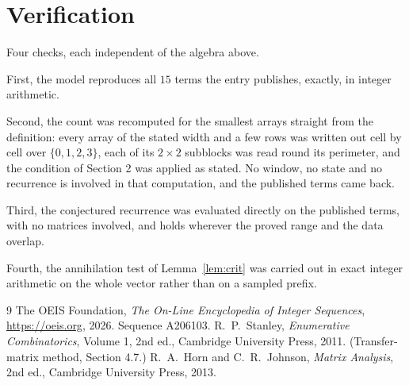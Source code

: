 \documentclass[11pt,a4paper]{article}
\theoremstyle{plain}
\theoremstyle{definition}
\begin{document}
\section{Verification}

Four checks, each independent of the algebra above.

First, the model reproduces all $15$ terms the entry publishes, exactly, in integer
arithmetic.

Second, the count was recomputed for the smallest arrays straight from the definition: every
array of the stated width and a few rows was written out cell by cell over $\{0,1,2,3\}$, each of
its $2\times2$ subblocks was read round its perimeter, and the condition of Section 2 was
applied as stated. No window, no state and no recurrence is involved in that computation, and
the published terms came back.

Third, the conjectured recurrence was evaluated directly on the published terms, with no
matrices involved, and holds wherever the proved range and the data overlap.

Fourth, the annihilation test of Lemma~\ref{lem:crit} was carried out in exact integer
arithmetic on the whole vector rather than on a sampled prefix.

\begin{thebibliography}{9}
 The OEIS Foundation, \emph{The On-Line Encyclopedia of Integer
Sequences}, \url{https://oeis.org}, 2026. Sequence A206103.
 R.~P.~Stanley, \emph{Enumerative Combinatorics}, Volume 1, 2nd ed.,
Cambridge University Press, 2011. (Transfer-matrix method, Section 4.7.)
 R.~A.~Horn and C.~R.~Johnson, \emph{Matrix Analysis}, 2nd ed., Cambridge
University Press, 2013.
\end{thebibliography}
\end{document}
